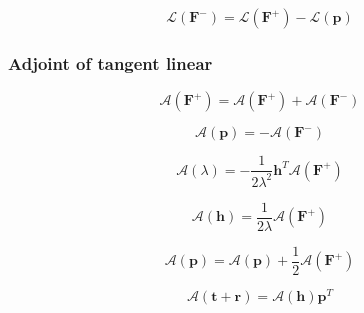 \begin{equation}
\mathcal{L}(\mathbf{F}^{-}) = \mathcal{L}(\mathbf{F}^{+}) - \mathcal{L}(\mathbf{p})
\label{eq:solar_source-local_solar_source-classical_reduced_order-tangent_linear-G_m}
\end{equation}


%
\subsubsection{Adjoint of tangent linear}
\label{sec:solar_source-local_solar_source-classical_reduced_order-adjoint_of_tangent_linear}

\begin{equation}
\mathcal{A}(\mathbf{F}^{+}) = \mathcal{A}(\mathbf{F}^{+}) + \mathcal{A}(\mathbf{F}^{-})
\label{eq:solar_source-local_solar_source-classical_reduced_order-adjoint_of_tangent_linear-F_p_a}
\end{equation}

\begin{equation}
\mathcal{A}(\mathbf{p}) = -\mathcal{A}(\mathbf{F}^{-})
\label{eq:solar_source-local_solar_source-classical_reduced_order-adjoint_of_tangent_linear-p_a}
\end{equation}

\begin{equation}
\mathcal{A}(\lambda) = -\frac{1}{2\lambda^{2}} \mathbf{h}^{T}\mathcal{A}(\mathbf{F}^{+})
\label{eq:solar_source-local_solar_source-classical_reduced_order-adjoint_of_tangent_linear-lambda_a}
\end{equation}

\begin{equation}
\mathcal{A}(\mathbf{h}) = \frac{1}{2\lambda} \mathcal{A}(\mathbf{F}^{+})
\label{eq:solar_source-local_solar_source-classical_reduced_order-adjoint_of_tangent_linear-h_a}
\end{equation}

\begin{equation}
\mathcal{A}(\mathbf{p}) = \mathcal{A}(\mathbf{p}) + \frac{1}{2} \mathcal{A}(\mathbf{F}^{+})
\label{eq:solar_source-local_solar_source-classical_reduced_order-adjoint_of_tangent_linear-p_a2}
\end{equation}

\begin{equation}
\mathcal{A}(\mathbf{t} + \mathbf{r}) = \mathcal{A}(\mathbf{h})\mathbf{p}^{T}
\label{eq:solar_source-local_solar_source-classical_reduced_order-adjoint_of_tangent_linear-tpr_a}
\end{equation}

